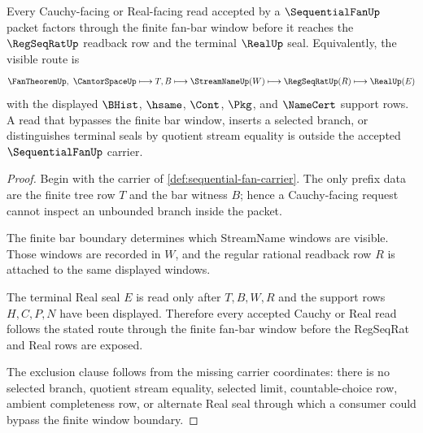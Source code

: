 \begin{theorem}\label{thm:sequential-fan-cauchy-window-boundary}
Every Cauchy-facing or Real-facing read accepted by a $\SequentialFanUp$ packet factors through the finite fan-bar window before it reaches the $\RegSeqRatUp$ readback row and the terminal $\RealUp$ seal. Equivalently, the visible route is
$$
\FanTheoremUp,\ \CantorSpaceUp \longmapsto T,B \longmapsto \StreamNameUp(W) \longmapsto \RegSeqRatUp(R) \longmapsto \RealUp(E)
$$
with the displayed $\BHist$, $\hsame$, $\Cont$, $\Pkg$, and $\NameCert$ support rows. A read that bypasses the finite bar window, inserts a selected branch, or distinguishes terminal seals by quotient stream equality is outside the accepted $\SequentialFanUp$ carrier.
\end{theorem}
\begin{proof}
Begin with the carrier of \autoref{def:sequential-fan-carrier}. The only prefix data are the finite tree row $T$ and the bar witness $B$; hence a Cauchy-facing request cannot inspect an unbounded branch inside the packet.

The finite bar boundary determines which StreamName windows are visible. Those windows are recorded in $W$, and the regular rational readback row $R$ is attached to the same displayed windows.

The terminal Real seal $E$ is read only after $T,B,W,R$ and the support rows $H,C,P,N$ have been displayed. Therefore every accepted Cauchy or Real read follows the stated route through the finite fan-bar window before the RegSeqRat and Real rows are exposed.

The exclusion clause follows from the missing carrier coordinates: there is no selected branch, quotient stream equality, selected limit, countable-choice row, ambient completeness row, or alternate Real seal through which a consumer could bypass the finite window boundary.
\end{proof}


\begin{closurestatus}{\SequentialFanUp}
  \theoryclosure{\seedClosure}
  \formalstatus{\unformalizedV}
\end{closurestatus}
